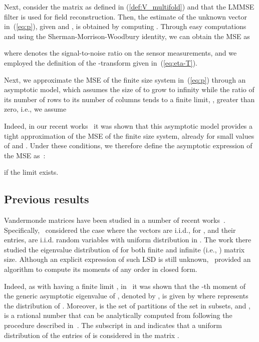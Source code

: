 \documentclass[11pt, draftcls, onecolumn, a4paper]{IEEEtran}
\begin{document}
Next, consider the matrix  as defined in (\ref{def:V_multifold}) 
and that  the LMMSE filter is used for field reconstruction.
Then, the estimate of the unknown vector
 in~(\ref{eq:p}), given  and , is obtained by computing
. Through easy
computations and using the Sherman-Morrison-Woodbury identity, 
we can obtain the MSE as 

where   denotes the signal-to-noise
ratio on the sensor measurements, and we employed the definition of the
-transform given in~(\ref{eq:eta-T}).

Next, we approximate the MSE of the finite size system in~(\ref{eq:p})
through an asymptotic model, which assumes the size of  to grow
to infinity while the ratio of its number of rows to its number of
columns tends to a finite limit, , greater than zero, i.e., we
assume
 

Indeed, in our recent works~\cite{TSP1,TSP2,TSP3} it was shown that this
asymptotic model provides a tight approximation of the MSE of the
finite size system, already for small values of  and .
Under these conditions, we therefore define the asymptotic expression
of the MSE as~\cite{TSP3}:

if the limit exists.

   
\subsection{Previous results}

Vandermonde matrices have been studied in a number of recent
works~\cite{TSP1,TSP2,TSP3,RyanDebbah}. Specifically,~\cite{TSP2}
considered the case where the vectors  are i.i.d., for
, and their entries,  are i.i.d. random
variables with uniform distribution in . The work there
studied the eigenvalue distribution 
  of  for both finite and infinite (i.e., ) matrix size.  Although an explicit expression of such LSD
  is still unknown,~\cite{TSP2} provided an algorithm to compute its
  moments of any order in closed form.

Indeed, as  with  having a
finite limit , in~\cite{TSP2} it was
shown that the -th moment of the generic asymptotic eigenvalue of 
, denoted by , is given by
 where  
represents the distribution of  .  Moreover, 
is the set of partitions of the set  in 
subsets, and ,  is a
rational number that can be analytically computed from 
following the procedure described in~\cite{TSP2}. The
subscript  in  and 
indicates that a uniform distribution of the entries of  is
considered in the matrix .
\end{document}

